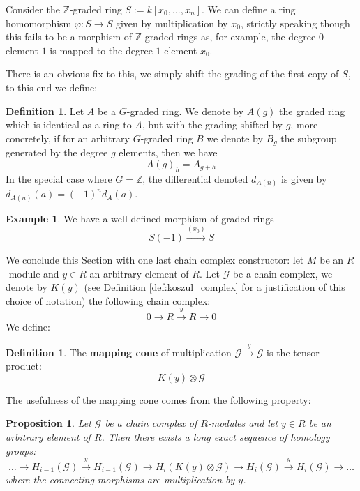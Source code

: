 \documentclass[12pt]{article}
\theoremstyle{plain}
\newtheorem{proposition}[thm]{Proposition}
\theoremstyle{definition}
\newtheorem{defn}[thm]{Definition} %
\newtheorem{example}[thm]{Example}
\newcommand{\bb}[1]{\mathbb{#1}}
\newcommand{\scr}[1]{\mathscr{#1}}
\newcommand{\lto}{\longrightarrow}
\begin{document}
Consider the $\bb{Z}$-graded ring $S := k[x_0,...,x_n]$. We can define a ring homomorphism $\varphi: S \lto S$ given by multiplication by $x_0$, strictly speaking though this fails to be a morphism of $\bb{Z}$-graded rings as, for example, the degree $0$ element $1$ is mapped to the degree $1$ element $x_0$.

There is an obvious fix to this, we simply shift the grading of the first copy of $S$, to this end we define:
\begin{defn}
	Let $A$ be a $G$-graded ring. We denote by $A(g)$ the graded ring which is identical as a ring to $A$, but with the grading shifted by $g$, more concretely, if for an arbitrary $G$-graded ring $B$ we denote by $B_g$ the subgroup generated by the degree $g$ elements, then we have
	\begin{equation}
		A(g)_h = A_{g + h}
	\end{equation}
	In the special case where $G = \bb{Z}$, the differential denoted $d_{A(n)}$ is given by $d_{A(n)}(a) = (-1)^nd_A(a)$.
\end{defn}
\begin{example}
	We have a well defined morphism of graded rings
	\begin{equation}
		S(-1) \stackrel{(x_0)}{\lto}S
	\end{equation}
\end{example}
We conclude this Section with one last chain complex constructor: let $M$ be an $R$-module and $y \in R$ an arbitrary element of $R$.  Let $\scr{G}$ be a chain complex, we denote by $K(y)$ (see Definition \ref{def:koszul_complex} for a justification of this choice of notation) the following chain complex:
\begin{equation}
	0 \lto R \stackrel{y}{\lto} R \lto 0
\end{equation}
We define:
\begin{defn}
	The \textbf{mapping cone} of multiplication $\scr{G} \stackrel{y}{\lto} \scr{G}$ is the tensor product:
	\begin{equation}
		K(y) \otimes \scr{G}
	\end{equation}
\end{defn}
The usefulness of the mapping cone comes from the following property:
\begin{proposition}\label{prop:mapping_exact_sequence}
	Let $\scr{G}$ be a chain complex of $R$-modules and let $y\in R$ be an arbitrary element of $R$. Then there exists a long exact sequence of homology groups:
	\begin{equation}\label{eq:mapping_exact_sequence}
		\hdots \lto H_{i-1}(\scr{G}) \stackrel{y}{\lto} H_{i-1}(\scr{G}) \lto H_{i}(K(y) \otimes \scr{G})\lto H_i(\scr{G}) \stackrel{y}{\lto} H_{i}(\scr{G}) \lto \hdots
	\end{equation}
	where the connecting morphisms are multiplication by $y$.
\end{proposition}
\end{document}
